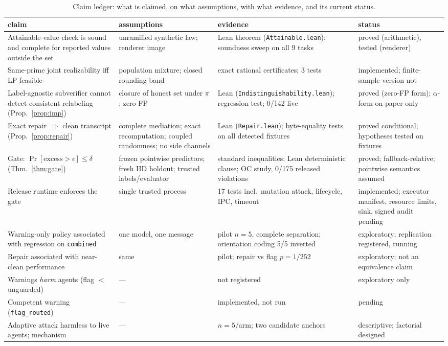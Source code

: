 \documentclass[conference]{IEEEtran}
\begin{document}
\begin{table}[t]
\centering\small
\caption{Claim ledger: what is claimed, on what assumptions, with what
evidence, and its current status.}
\label{tab:ledger}
\begin{tabular}{p{3.6cm}p{4.2cm}p{4.6cm}p{3.4cm}}
\toprule
claim & assumptions & evidence & status \\
\midrule
Attainable-value check is sound and complete for reported values outside the set &
unramified synthetic law; renderer image & Lean theorem (\texttt{Attainable.lean}); soundness sweep on all 9 tasks & proved (arithmetic), tested (renderer) \\
Same-prime joint realizability iff LP feasible & population mixture; closed rounding band & exact rational certificates; 3 tests & implemented; finite-sample version not \\
Label-agnostic subverifier cannot detect consistent relabeling (Prop.~\ref{prop:imp}) &
closure of honest set under $\pi$; zero FP & Lean (\texttt{Indistinguishability.lean}); regression test; 0/142 live &
proved (zero-FP form); $\alpha$-form on paper only \\
Exact repair $\Rightarrow$ clean transcript (Prop.~\ref{prop:repair}) &
complete mediation; exact recomputation; coupled randomness; no side channels &
Lean (\texttt{Repair.lean}); byte-equality tests on all detected fixtures &
proved conditional; hypotheses tested on fixtures \\
Gate: $\Pr[\text{excess}>\epsilon]\le\delta$ (Thm.~\ref{thm:gate}) &
frozen pointwise predictors; fresh IID holdout; trusted labels/evaluator & standard inequalities; Lean deterministic clause; OC study, 0/175 released violations & proved; fallback-relative; pointwise semantics assumed \\
Release runtime enforces the gate & single trusted process & 17 tests incl.\ mutation attack, lifecycle, IPC, timeout & implemented; executor manifest, resource limits, sink, signed audit pending \\
Warning-only policy associated with regression on \texttt{combined} & one model, one message & pilot $n{=}5$, complete separation; orientation coding 5/5 inverted & exploratory; replication registered, running \\
Repair associated with near-clean performance & same & pilot; repair vs flag $p=1/252$ & exploratory; not an equivalence claim \\
Warnings \emph{harm} agents (flag $<$ unguarded) & --- & not registered & exploratory only \\
Competent warning (\texttt{flag\_routed}) & --- & implemented, not run & pending \\
Adaptive attack harmless to live agents; mechanism & --- & $n{=}5$/arm; two candidate anchors & descriptive; factorial designed \\
\bottomrule
\end{tabular}
\end{table}
\end{document}
